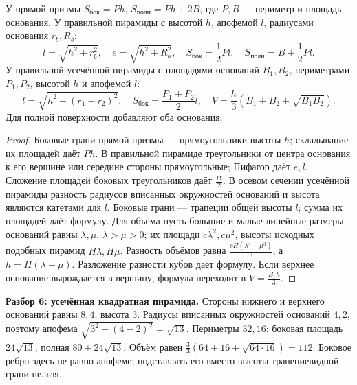 \begin{theorem}\label{thm:exam-solid-areas}
У прямой призмы \(S_{\mathrm{бок}}=Ph\), \(S_{\mathrm{полн}}=Ph+2B\), где \(P,B\) — периметр и площадь основания. У правильной пирамиды с высотой \(h\), апофемой \(l\), радиусами основания \(r_b,R_b\):
\[
l=\sqrt{h^2+r_b^2},\quad e=\sqrt{h^2+R_b^2},\quad
S_{\mathrm{бок}}=\frac{1}{2}Pl,\quad S_{\mathrm{полн}}=B+\frac{1}{2}Pl.
\]
У правильной усечённой пирамиды с площадями оснований \(B_1,B_2\), периметрами \(P_1,P_2\), высотой \(h\) и апофемой \(l\):
\[
l=\sqrt{h^2+(r_1-r_2)^2},\quad
S_{\mathrm{бок}}=\frac{P_1+P_2}{2}l,\quad
V=\frac{h}{3}(B_1+B_2+\sqrt{B_1B_2}).
\]
Для полной поверхности добавляют оба основания.
\end{theorem}
\begin{proof}Боковые грани прямой призмы — прямоугольники высоты \(h\); складывание их площадей даёт \(Ph\). В правильной пирамиде треугольники от центра основания к его вершине или середине стороны прямоугольные; Пифагор даёт \(e,l\). Сложение площадей боковых треугольников даёт \(\frac{Pl}{2}\).
В осевом сечении усечённой пирамиды разность радиусов вписанных окружностей оснований и высота являются катетами для \(l\). Боковые грани — трапеции общей высоты \(l\); сумма их площадей даёт формулу. Для объёма пусть большие и малые линейные размеры оснований равны \(\lambda,\mu\), \(\lambda>\mu>0\); их площади \(c\lambda^2,c\mu^2\), высоты исходных подобных пирамид \(H\lambda,H\mu\). Разность объёмов равна \(\frac{cH(\lambda^3-\mu^3)}{3}\), а \(h=H(\lambda-\mu)\). Разложение разности кубов даёт формулу. Если верхнее основание вырождается в вершину, формула переходит в \(V=\frac{B_1h}{3}\).\end{proof}
\begin{example}\textbf{Разбор 6: усечённая квадратная пирамида.} Стороны нижнего и верхнего оснований равны \(8,4\), высота \(3\). Радиусы вписанных окружностей оснований \(4,2\), поэтому апофема \(\sqrt{3^2+(4-2)^2}=\sqrt{13}\). Периметры \(32,16\); боковая площадь \(24\sqrt{13}\), полная \(80+24\sqrt{13}\). Объём равен \(\frac{3}{3}(64+16+\sqrt{64\cdot16})=112\). Боковое ребро здесь не равно апофеме; подставлять его вместо высоты трапециевидной грани нельзя.\end{example}

